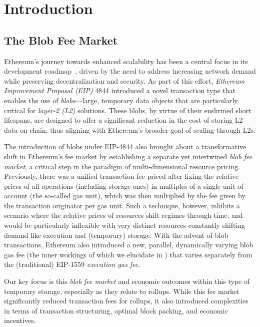 \section{Introduction}

\newcommand{\nume}{num\'eraire\xspace}

\subsection{The Blob Fee Market}

Ethereum's journey towards enhanced scalability has been a central focus in its development roadmap~\parencite{buterin2024tweet}, driven by the need to address increasing network demand while preserving decentralization and security. As part of this effort, \textit{Ethereum Improvement Proposal (EIP)} 4844 introduced a novel transaction type that enables the use of \textit{blobs}---large, temporary data objects that are particularly critical for \textit{layer-2 (L2)} solutions. These blobs, by virtue of their enshrined short lifespans, are designed to offer a significant reduction in the cost of storing L2 data on-chain, thus aligning with Ethereum's broader goal of scaling through L2s.

The introduction of blobs under EIP-4844 also brought about a transformative shift in Ethereum's fee market by establishing a separate yet intertwined \emph{blob fee market}, a critical step in the paradigm of multi-dimensional resource pricing. Previously, there was a unified transaction fee priced after fixing the relative prices of all operations (including storage ones) in multiples of a single unit of account (the so-called gas unit), which was then multiplied by the fee given by the transaction originator per gas unit. Such a technique, however, inhibits a scenario where the relative prices of resources shift regimes through time, and would be particularly inflexible with very distinct resources constantly shifting demand like execution and (temporary) storage. With the advent of blob transactions, Ethereum also introduced a new, parallel, dynamically varying blob gas fee (the inner workings of which we elucidate in ) that varies separately from the (traditional) EIP-1559 \textit{execution gas fee}.

Our key focus is this \emph{blob fee market} and economic outcomes within this type of temporary storage, especially as they relate to rollups. While this fee market significantly reduced transaction fees for rollups, it also introduced complexities in terms of transaction structuring, optimal block packing, and economic incentives.

